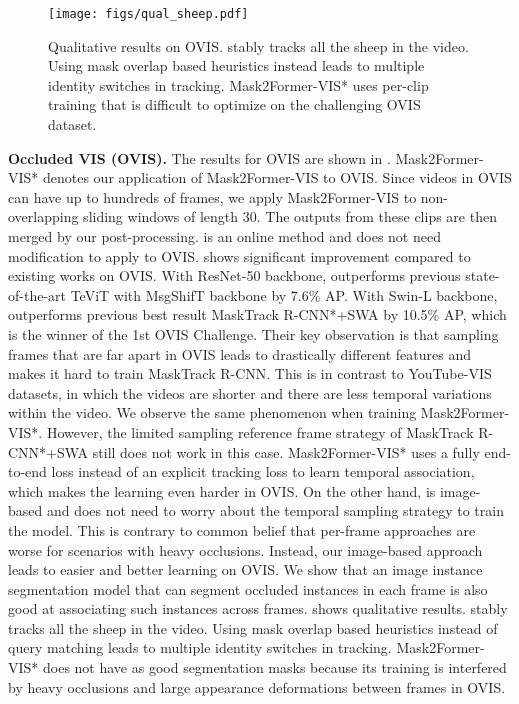 \begin{figure}
  \centering
  \texttt{[image: figs/qual\_sheep.pdf]}
  \caption{Qualitative results on OVIS. \ours stably tracks all the sheep in the video. 
  Using mask overlap based heuristics instead leads to multiple identity switches in tracking.
  Mask2Former-VIS* uses per-clip training that is difficult to optimize on the challenging OVIS dataset.}
  \label{fig:qual}
\end{figure}



\noindent\textbf{Occluded VIS (OVIS).}  The results for OVIS are shown in . 
Mask2Former-VIS* denotes our application of Mask2Former-VIS to OVIS. Since videos in OVIS can have up to hundreds of frames, we apply Mask2Former-VIS to non-overlapping sliding windows of length 30. The outputs from these clips are then merged by our post-processing. \ours is an online method and does not need modification to apply to OVIS. 
\ours shows significant improvement compared to existing works on OVIS. 
With ResNet-50 backbone, \ours outperforms previous state-of-the-art TeViT with MsgShifT backbone by 7.6\% AP. With Swin-L backbone, \ours outperforms previous best result MaskTrack R-CNN*+SWA by 10.5\% AP, which is the winner of the 1st OVIS Challenge. Their key observation is that sampling frames that are far apart in OVIS leads to drastically different features and makes it hard to train MaskTrack R-CNN. This is in contrast to YouTube-VIS datasets, in which the videos are shorter and there are less temporal variations within the video. We observe the same phenomenon when training Mask2Former-VIS*. However, the limited sampling reference frame strategy of MaskTrack R-CNN*+SWA still does not work in this case. Mask2Former-VIS* uses a fully end-to-end loss instead of an explicit tracking loss to learn temporal association, which makes the learning even harder in OVIS. On the other hand, \ours is image-based and does not need to worry about the temporal sampling strategy to train the model. This is contrary to common belief that per-frame approaches are worse for scenarios with heavy occlusions. Instead, our image-based approach leads to easier and better learning on OVIS. 
We show that an image instance segmentation model that can segment occluded instances in each frame is also good at associating such instances across frames. 
 shows qualitative results. \ours stably tracks all the sheep in the video. Using mask overlap based heuristics instead of query matching leads to multiple identity switches in tracking.
Mask2Former-VIS* does not have as good segmentation masks because its training is interfered by heavy occlusions and large appearance deformations between frames in OVIS.  


